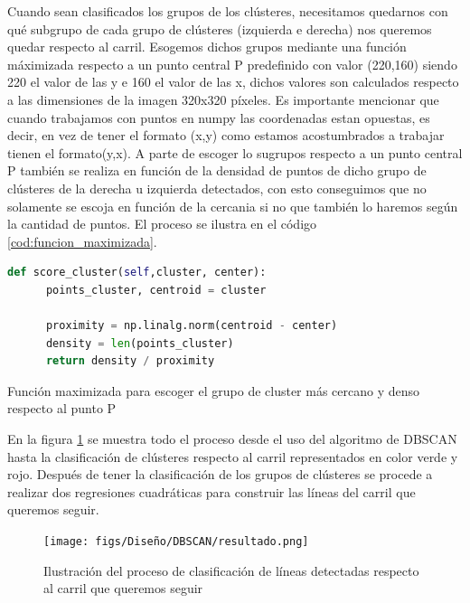 Cuando sean clasificados los grupos de los clústeres, necesitamos quedarnos con qué subgrupo de cada grupo de clústeres (izquierda e derecha) nos queremos quedar respecto al carril. Esogemos dichos grupos mediante una función máximizada 
respecto a un punto central P predefinido con valor (220,160) siendo 220 el valor de las y e 160 el valor de las x, dichos valores son calculados respecto 
a las dimensiones de la imagen 320x320 píxeles. Es importante mencionar que cuando trabajamos con puntos en numpy las coordenadas estan opuestas, es decir, en vez de tener el formato (x,y) como estamos acostumbrados a trabajar tienen el formato(y,x). 
A parte de escoger lo sugrupos respecto a un punto central P también se realiza en función de la densidad de puntos de dicho grupo de clústeres de la derecha u izquierda detectados, 
con esto conseguimos que no solamente se escoja en función de la cercania si no que también lo haremos según la cantidad de puntos. El proceso se ilustra 
en el código \ref{cod:funcion_maximizada}.\newline

\begin{code}[h]
  \begin{lstlisting}[language=Python]
    def score_cluster(self,cluster, center):
      points_cluster, centroid = cluster
    
      proximity = np.linalg.norm(centroid - center)
      density = len(points_cluster)
      return density / proximity

  \end{lstlisting}
  \caption[Función maximizada para escoger el grupo de cluster más cercano y denso respecto al punto P]{Función maximizada para escoger el grupo de cluster más cercano y denso respecto al punto P}
  \label{cod:funcion_maximizada}
  \end{code}  

  En la figura \ref{fig:DBSCAN_imagen} se muestra todo el proceso desde el uso del algoritmo de DBSCAN hasta la clasificación de clústeres respecto al carril 
  representados en color verde y rojo. Después de tener la clasificación de los grupos de clústeres se procede a realizar dos regresiones cuadráticas para construir las líneas del carril que queremos seguir.

\begin{figure} [H]
  \begin{center}
    \texttt{[image: figs/Diseño/DBSCAN/resultado.png]}
  \end{center}
  \caption{Ilustración del proceso de clasificación de líneas detectadas respecto al carril que queremos seguir}
  \label{fig:DBSCAN_imagen}
\end{figure}\

